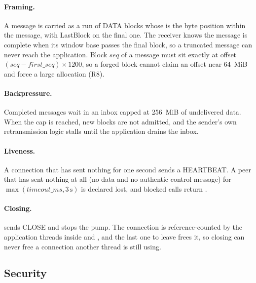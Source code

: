 \paragraph{Framing.} A message is carried as a run of DATA blocks whose  is the byte position
within the message, with LastBlock on the final one. The receiver knows the message is complete when its window
base passes the final block, so a truncated message can never reach the application. Block $\mathit{seq}$ of a
message must sit exactly at offset $(\mathit{seq}-\mathit{first\_seq})\times1200$, so a forged block cannot claim
an offset near 64~MiB and force a large allocation (R8).

\paragraph{Backpressure.} Completed messages wait in an inbox capped at 256~MiB of undelivered data. When the cap
is reached, new blocks are not admitted, and the sender's own retransmission logic stalls until the application
drains the inbox.

\paragraph{Liveness\vviii.} A connection that has sent nothing for one second sends a HEARTBEAT. A peer that
has sent nothing at all (no data and no authentic control message) for $\max(\mathit{timeout\_ms},3\,\mathrm{s})$
is declared lost, and blocked calls return .

\paragraph{Closing.}  sends CLOSE and stops the pump. The connection is reference-counted by
the application threads inside  and , and the last one to leave frees it, so
closing can never free a connection another thread is still using.

\subsection{Security}

